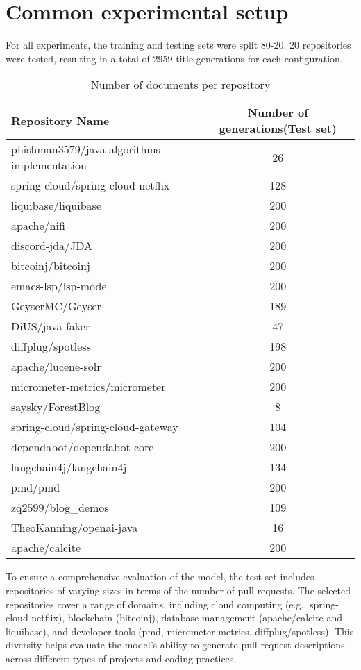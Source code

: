 \section{Common experimental setup}
For all experiments, the training and testing sets were split 80-20. 20 repositories were tested, resulting in a total of 2959 title generations for each configuration.
\begin{table}[H]
    \centering
    \begin{tabular}{|l|c|}
        \hline
        \textbf{Repository Name} & \textbf{Number of generations(Test set)} \\
        \hline
        phishman3579/java-algorithms-implementation & 26 \\
        spring-cloud/spring-cloud-netflix & 128 \\
        liquibase/liquibase & 200 \\
        apache/nifi & 200 \\
        discord-jda/JDA & 200 \\
        bitcoinj/bitcoinj & 200 \\
        emacs-lsp/lsp-mode & 200 \\
        GeyserMC/Geyser & 189 \\
        DiUS/java-faker & 47 \\
        diffplug/spotless & 198 \\
        apache/lucene-solr & 200 \\
        micrometer-metrics/micrometer & 200 \\
        saysky/ForestBlog & 8 \\
        spring-cloud/spring-cloud-gateway & 104 \\
        dependabot/dependabot-core & 200 \\
        langchain4j/langchain4j & 134 \\
        pmd/pmd & 200 \\
        zq$2599$/blog\_demos & 109 \\
        TheoKanning/openai-java & 16 \\
        apache/calcite & 200 \\
        \hline
    \end{tabular}
    \caption{Number of documents per repository}
    \label{tab:repository_document_count}
\end{table}
To ensure a comprehensive evaluation of the model, the test set includes repositories of varying sizes in terms of the number of pull requests. The selected repositories cover a range of domains, including cloud computing (e.g., spring-cloud-netflix), blockchain (bitcoinj), database management (apache/calcite and liquibase), and developer tools (pmd, micrometer-metrics, diffplug/spotless). This diversity helps evaluate the model's ability to generate pull request descriptions across different types of projects and coding practices.
